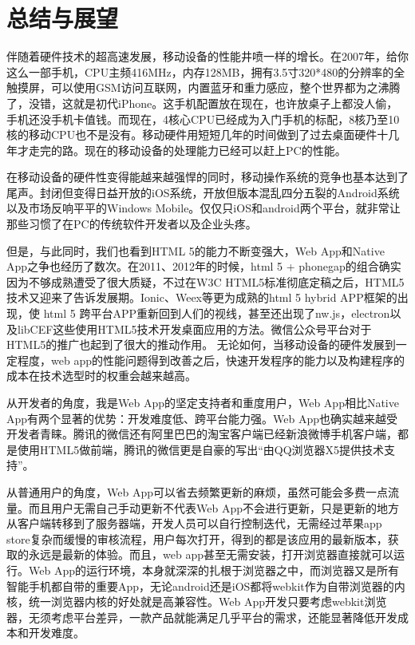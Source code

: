 \chapter{总结与展望}

\par 

\indent \indent 伴随着硬件技术的超高速发展，移动设备的性能井喷一样的增长。在2007年，给你这么一部手机，CPU主频416MHz，内存128MB，拥有3.5寸320*480的分辨率的全触摸屏，可以使用GSM访问互联网，内置蓝牙和重力感应，整个世界都为之沸腾了，没错，这就是初代iPhone。这手机配置放在现在，也许放桌子上都没人偷，手机还没手机卡值钱。而现在，4核心CPU已经成为入门手机的标配，8核乃至10核的移动CPU也不是没有。移动硬件用短短几年的时间做到了过去桌面硬件十几年才走完的路。现在的移动设备的处理能力已经可以赶上PC的性能。

在移动设备的硬件性变得能越来越强悍的同时，移动操作系统的竞争也基本达到了尾声。封闭但变得日益开放的iOS系统，开放但版本混乱四分五裂的Android系统以及市场反响平平的Windows Mobile。仅仅只iOS和android两个平台，就非常让那些习惯了在PC的传统软件开发者以及企业头疼。

但是，与此同时，我们也看到HTML 5的能力不断变强大，Web App和Native App之争也经历了数次。在2011、2012年的时候，html 5 + phonegap的组合确实因为不够成熟遭受了很大质疑，不过在W3C HTML5标准彻底定稿之后，HTML5技术又迎来了告诉发展期。Ionic、Weex等更为成熟的html 5 hybrid APP框架的出现，使 html 5 跨平台APP重新回到人们的视线，甚至还出现了nw.js，electron以及libCEF这些使用HTML5技术开发桌面应用的方法。微信公众号平台对于HTML5的推广也起到了很大的推动作用。
无论如何，当移动设备的硬件发展到一定程度，web app的性能问题得到改善之后，快速开发程序的能力以及构建程序的成本在技术选型时的权重会越来越高。

从开发者的角度，我是Web App的坚定支持者和重度用户，Web App相比Native App有两个显著的优势：开发难度低、跨平台能力强。Web App也确实越来越受开发者青睐。腾讯的微信还有阿里巴巴的淘宝客户端已经新浪微博手机客户端，都是使用HTML5做前端，腾讯的微信更是自豪的写出“由QQ浏览器X5提供技术支持”。

从普通用户的角度，Web App可以省去频繁更新的麻烦，虽然可能会多费一点流量。而且用户无需自己手动更新不代表Web App不会进行更新，只是更新的地方从客户端转移到了服务器端，开发人员可以自行控制迭代，无需经过苹果app store复杂而缓慢的审核流程，用户每次打开，得到的都是该应用的最新版本，获取的永远是最新的体验。而且，web app甚至无需安装，打开浏览器直接就可以运行。Web App的运行环境，本身就深深的扎根于浏览器之中，而浏览器又是所有智能手机都自带的重要App，无论android还是iOS都将webkit作为自带浏览器的内核，统一浏览器内核的好处就是高兼容性。Web App开发只要考虑webkit浏览器，无须考虑平台差异，一款产品就能满足几乎平台的需求，还能显著降低开发成本和开发难度。

